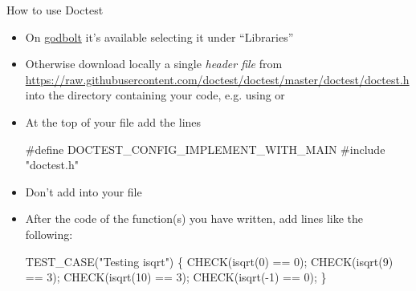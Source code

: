 \begin{frame}[fragile]{How to use Doctest}

  \begin{itemize}
  \item On \href{https://godbolt.org/}{godbolt} it's available selecting it
    under ``Libraries''
  \item Otherwise download locally a single \textit{header file} from
    \url{https://raw.githubusercontent.com/doctest/doctest/master/doctest/doctest.h}
    into the directory containing your code, e.g. using  or
  \item At the top of your \Cpp{} file add the lines
    \begin{codeblock}
#define DOCTEST\_CONFIG\_IMPLEMENT\_WITH\_MAIN
#include "doctest.h"\end{codeblock}
  \item Don't add  into your file
  \item After the code of the function(s) you have written, add lines like the
    following:
    \begin{codeblock}
TEST_CASE("Testing isqrt") \{
  CHECK(isqrt(0) == 0);
  CHECK(isqrt(9) == 3);
  CHECK(isqrt(10) == 3);
  CHECK(isqrt(-1) == 0);
  \ddd
\}\end{codeblock}

  \end{itemize}

\end{frame}

